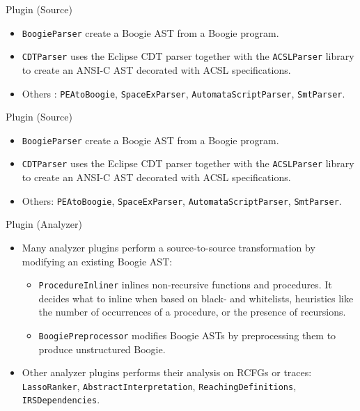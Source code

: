 \documentclass[12pt]{beamer}
\newcommand{\code}[1]{\texttt{#1}}
\begin{document}
\begin{frame}{Plugin (Source)}
	\begin{itemize}
		\item \code{BoogieParser} create a Boogie AST from a Boogie program.
		\item \code{CDTParser} uses the Eclipse CDT parser together with the \code{ACSLParser} library to create an ANSI-C AST decorated with ACSL specifications. 
		\item Others : \code{PEAtoBoogie}, \code{SpaceExParser}, \code{AutomataScriptParser}, \code{SmtParser}.
	\end{itemize}
\end{frame}

\begin{frame}{Plugin (Source)}
	\begin{itemize}
		\item \code{BoogieParser} create a Boogie AST from a Boogie program.
		\item \code{CDTParser} uses the Eclipse CDT parser together with the \code{ACSLParser} library to create an ANSI-C AST decorated with ACSL specifications. 
		\item Others: \code{PEAtoBoogie}, \code{SpaceExParser}, \code{AutomataScriptParser}, \code{SmtParser}.
	\end{itemize}
\end{frame}

\begin{frame}{Plugin (Analyzer)}
	\begin{itemize}
		\item Many analyzer plugins perform a source-to-source transformation by modifying an existing Boogie AST:
		\begin{itemize}
			\item \code{ProcedureInliner} inlines non-recursive functions and procedures. It decides what to inline when based on black- and whitelists, heuristics like the number of occurrences of a procedure, or the presence of recursions.
			\item \code{BoogiePreprocessor} modifies Boogie ASTs by preprocessing them to produce unstructured Boogie.
		\end{itemize}
		\item Other analyzer plugins performs their analysis on RCFGs or traces: \code{LassoRanker}, \code{AbstractInterpretation}, \code{ReachingDefinitions}, \code{IRSDependencies}.
	\end{itemize}
\end{frame}
\end{document}
